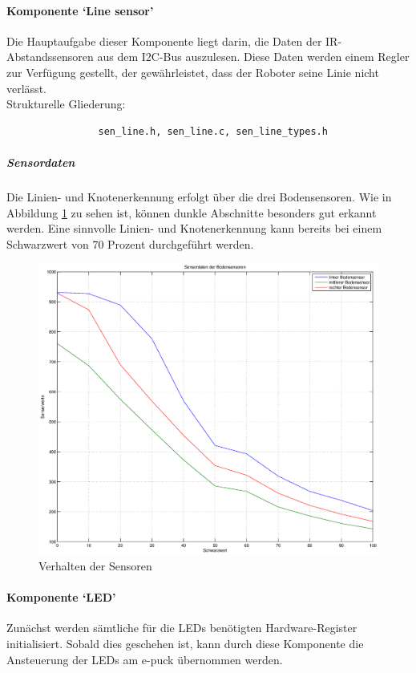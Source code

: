 \documentclass[10pt,a4paper]{article}
\begin{document}
			\paragraph*{Komponente `Line sensor'}
			Die Hauptaufgabe dieser Komponente liegt darin, die Daten der IR-Abstandssensoren aus dem I2C-Bus auszulesen. Diese Daten werden 
			einem Regler zur Verfügung gestellt, der gewährleistet, dass der Roboter seine Linie nicht verlässt. \\
			
			Strukturelle Gliederung:
				\begin{verbatim}  
				sen_line.h, sen_line.c, sen_line_types.h
				\end{verbatim}

			\subparagraph*{Sensordaten}
				Die Linien- und Knotenerkennung erfolgt über die drei Bodensensoren. Wie in Abbildung \ref{fig:auswertung} zu sehen ist,
				können dunkle Abschnitte besonders gut erkannt werden. Eine sinnvolle Linien- und Knotenerkennung kann bereits bei einem Schwarzwert von
				70 Prozent durchgeführt werden.
				\begin{figure}[h]
					\centering
					\includegraphics[width=18cm]{images/sensorgrafik.eps}
					\caption{Verhalten der Sensoren}		
					\label{fig:auswertung}	
				\end{figure}
			
			\paragraph*{Komponente `LED'}
			Zunächst werden sämtliche für die LEDs benötigten Hardware-Register initialisiert. Sobald dies geschehen ist, kann durch diese Komponente
			die Ansteuerung der LEDs am e-puck übernommen werden.
			
\end{document}
